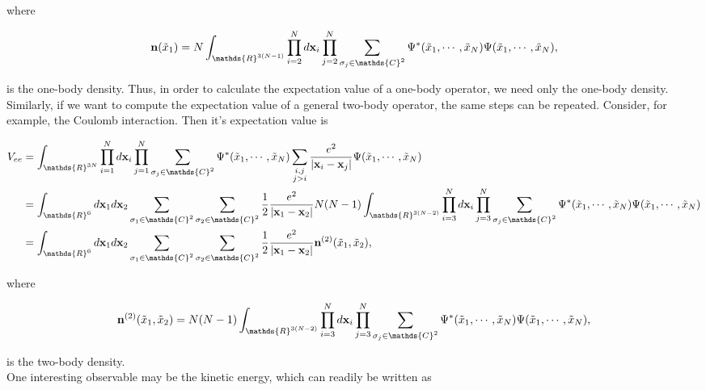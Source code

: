 \documentclass{homework}
\begin{document}
where 
 
\begin{equation}
{\bf n}(\tilde{x}_1) = N \int_{\mathds{R}^{3(N-1)}} \prod_{i=2}^N d{\bf x}_i \prod_{j=2}^{N} \sum_{\sigma_j \in \mathds{C}^2} \Psi^{*}(\tilde{x}_1, \cdots, \tilde{x}_N)
     \Psi(\tilde{x}_1, \cdots, \tilde{x}_N),
\label{one-body density}
\end{equation}

is the one-body density. Thus, in order to calculate the expectation value of a one-body operator, we need only the one-body density. Similarly, if we want to compute the expectation value of a general two-body operator, the same steps can be repeated. Consider, for example, the Coulomb interaction. Then it's expectation value is 

\begin{align}
     V_{ee} &= \int_{\mathds{R}^{3N}} \prod_{i=1}^N d{\bf x}_i \prod_{j=1}^{N} \sum_{\sigma_j \in \mathds{C}^2} \Psi^{*}(\tilde{x}_1, \cdots, \tilde{x}_N)
     \sum_{\substack{i,j\\
          j > i}} 
     \frac{e^2}{|{\bf x}_i-{\bf x}_j|}
     \Psi(\tilde{x}_1, \cdots, \tilde{x}_N) \\
     &= \int_{\mathds{R}^{6}} d{\bf x}_1 d{\bf x}_2 \sum_{\sigma_1 \in \mathds{C}^2} \sum_{\sigma_2 \in \mathds{C}^2} \frac{1}{2} \frac{e^2}{|{\bf x}_1-{\bf x}_2|} N(N-1) \int_{\mathds{R}^{3(N-2)}} \prod_{i=3}^N d{\bf x}_i \prod_{j=3}^{N} \sum_{\sigma_j \in \mathds{C}^2} \Psi^{*}(\tilde{x}_1, \cdots, \tilde{x}_N)
     \Psi(\tilde{x}_1, \cdots, \tilde{x}_N) \\
     &=\int_{\mathds{R}^{6}} d{\bf x}_1 d{\bf x}_2 \sum_{\sigma_1 \in \mathds{C}^2} \sum_{\sigma_2 \in \mathds{C}^2} \frac{1}{2} \frac{e^2}{|{\bf x}_1-{\bf x}_2|} {\bf n}^{(2)}(\tilde{x}_1, \tilde{x}_2),
\label{two-body ensemble avg}
\end{align}

where

$$
{\bf n}^{(2)}(\tilde{x}_1, \tilde{x}_2) = N(N-1) \int_{\mathds{R}^{3(N-2)}} \prod_{i=3}^N d{\bf x}_i \prod_{j=3}^{N} \sum_{\sigma_j \in \mathds{C}^2} \Psi^{*}(\tilde{x}_1, \cdots, \tilde{x}_N)
     \Psi(\tilde{x}_1, \cdots, \tilde{x}_N),
$$

is the two-body density.  \\

One interesting observable may be the kinetic  energy, which can readily be written as 
\end{document}
